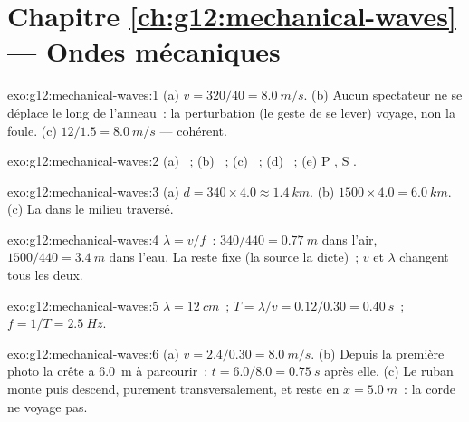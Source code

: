 \section*{Chapitre \ref{ch:g12:mechanical-waves} --- Ondes mécaniques}

\begin{solution}{exo:g12:mechanical-waves:1}
(a) $v = 320/40 = \qty{8.0}{m/s}$. (b) Aucun spectateur ne se déplace
le long de l'anneau~: la perturbation (le geste de se lever) voyage, non
la foule.
(c) $12/1.5 = \qty{8.0}{m/s}$ --- cohérent.
\end{solution}

\begin{solution}{exo:g12:mechanical-waves:2}
(a) ~; (b) ~; (c) ~; (d) ~;
(e) P , S .
\end{solution}

\begin{solution}{exo:g12:mechanical-waves:3}
(a) $d = 340 \times 4.0 \approx \qty{1.4}{km}$.
(b) $1500 \times 4.0 = \qty{6.0}{km}$. (c) La  dans
le milieu traversé.
\end{solution}

\begin{solution}{exo:g12:mechanical-waves:4}
$\lambda = v/f$~: $340/440 = \qty{0.77}{m}$ dans l'air,
$1500/440 = \qty{3.4}{m}$ dans l'eau. La  reste fixe (la
source la dicte)~; $v$ et $\lambda$ changent tous les deux.
\end{solution}

\begin{solution}{exo:g12:mechanical-waves:5}
$\lambda = \qty{12}{cm}$~; $T = \lambda/v = 0.12/0.30 = \qty{0.40}{s}$~;
$f = 1/T = \qty{2.5}{Hz}$.
\end{solution}

\begin{solution}{exo:g12:mechanical-waves:6}
(a) $v = 2.4/0.30 = \qty{8.0}{m/s}$. (b) Depuis la première photo la
crête a \qty{6.0}{m} à parcourir~: $t = 6.0/8.0 = \qty{0.75}{s}$ après
elle. (c) Le ruban monte puis descend, purement transversalement, et
reste en $x = \qty{5.0}{m}$~: la corde ne voyage pas.
\end{solution}

